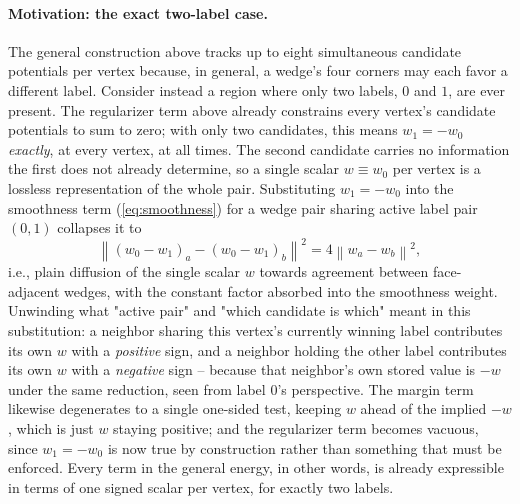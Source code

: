 \documentclass[journal]{vgtc}                     %
\begin{document}
\paragraph{Motivation: the exact two-label case.} The general construction above tracks up to eight simultaneous candidate potentials per vertex because, in general, a wedge's four corners may each favor a different label. Consider instead a region where only two labels, $0$ and $1$, are ever present. The regularizer term above already constrains every vertex's candidate potentials to sum to zero; with only two candidates, this means $w_1 = -w_0$ \emph{exactly}, at every vertex, at all times. The second candidate carries no information the first does not already determine, so a single scalar $w \equiv w_0$ per vertex is a lossless representation of the whole pair. Substituting $w_1=-w_0$ into the smoothness term (\cref{eq:smoothness}) for a wedge pair sharing active label pair $(0,1)$ collapses it to
\begin{equation} \label{eq:tworeduce}
	\left\| (w_0-w_1)_a - (w_0-w_1)_b \right\|^2 = 4 \left\| w_a - w_b \right\|^2 ,
\end{equation}
i.e., plain diffusion of the single scalar $w$ towards agreement between face-adjacent wedges, with the constant factor absorbed into the smoothness weight. Unwinding what "active pair" and "which candidate is which" meant in this substitution: a neighbor sharing this vertex's currently winning label contributes its own $w$ with a \emph{positive} sign, and a neighbor holding the other label contributes its own $w$ with a \emph{negative} sign -- because that neighbor's own stored value is $-w$ under the same reduction, seen from label $0$'s perspective. The margin term likewise degenerates to a single one-sided test, keeping $w$ ahead of the implied $-w$, which is just $w$ staying positive; and the regularizer term becomes vacuous, since $w_1=-w_0$ is now true by construction rather than something that must be enforced. Every term in the general energy, in other words, is already expressible in terms of one signed scalar per vertex, for exactly two labels.
\end{document}
